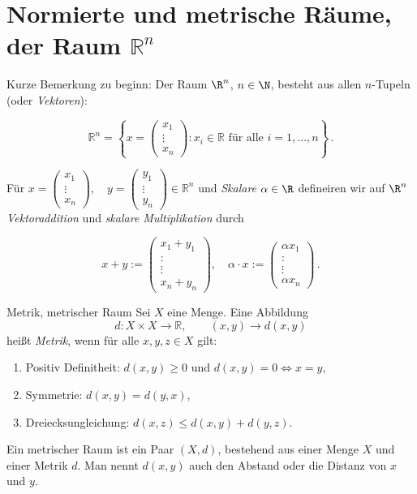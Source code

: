 \section{Normierte und metrische Räume, der Raum $\mathbb{R}^n$}
\label{sec:2.2}

Kurze Bemerkung zu beginn:
Der Raum $\R^n$, $n \in \N$, besteht aus allen $n$-Tupeln (oder \emph{Vektoren}):

$$
\mathbb{R}^n = \left\{ x = \begin{pmatrix} x_1 \\ \vdots \\ x_n \end{pmatrix} : x_i \in \mathbb{R} \text{ für alle } i = 1, \dots, n \right\} \, .
$$

Für $x = \begin{pmatrix} x_1 \\ \vdots \\ x_n \end{pmatrix}, \quad y = \begin{pmatrix} y_1 \\ \vdots \\ y_n \end{pmatrix} \in \mathbb{R}^n$ und \emph{Skalare} $\alpha \in \R$ defineiren wir auf $\R^n$ \emph{Vektoraddition} und \emph{skalare Multiplikation} durch

$$
x + y := \begin{pmatrix} x_1 + y_1 \\ : \\ \vdots \\ x_n + y_n \end{pmatrix}, \quad \alpha \cdot x := \begin{pmatrix} \alpha x_1 \\ : \\ \vdots \\ \alpha x_n \end{pmatrix} \, .
$$

\begin{definition}{Metrik, metrischer Raum}
    Sei $X$ eine Menge. Eine Abbildung 
    $$
    d : X \times X \to \mathbb{R}, \qquad (x,y) \to d(x,y)
    $$
    heißt \emph{Metrik}, wenn für alle $x,y,z \in X$ gilt:

    \begin{enumerate}
        \item[(M1)] Positiv Definitheit: $d(x,y)\geq 0$ und $d(x,y)=0 \Leftrightarrow x=y$,
        \item[(M2)] Symmetrie: $d(x,y)=d(y,x)$,
        \item[(M3)] Dreiecksungleichung: $d(x,z) \le d(x,y) + d(y,z)$.
    \end{enumerate}

    Ein metrischer Raum ist ein Paar $(X,d)$, bestehend aus einer Menge $X$ und einer Metrik $d$.
    Man nennt $d(x, y)$ auch den Abstand oder die Distanz von $x$ und $y$.
\end{definition}

